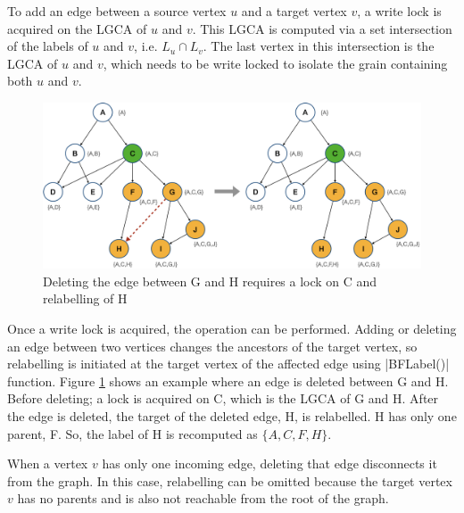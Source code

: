 To add an edge between a source vertex $u$ and a target vertex $v$, a write lock is acquired on the LGCA of $u$ and $v$. This LGCA is computed via a set intersection of the labels of $u$ and $v$, i.e. $L_u \cap L_v$. The last vertex in this intersection is the LGCA of $u$ and $v$, which needs to be write locked to isolate the grain containing both $u$ and $v$.

\begin{figure}[h]
	\centering
	\captionsetup{justification=centering}
	\includegraphics[width=\columnwidth]{figures/CALock_Delete_Edge.png}
	\caption{Deleting the edge between G and H requires a lock on C and relabelling of H}
	\label{fig:calockedgedeletion}
\end{figure}

Once a write lock is acquired, the operation can be performed. Adding or deleting an edge between two vertices changes the ancestors of the target vertex, so relabelling is initiated at the target vertex of the affected edge using \inline|BFLabel()| function. Figure \ref{fig:calockedgedeletion} shows an example where an edge is deleted between G and H. Before deleting; a lock is acquired on C, which is the LGCA of G and H. After the edge is deleted, the target of the deleted edge, H, is relabelled. H has only one parent, F. So, the label of H is recomputed as $\{A, C, F, H\}$.

When a vertex $v$ has only one incoming edge, deleting that edge disconnects it from the graph. 
In this case, relabelling can be omitted because the target vertex $v$ has no parents and is also not reachable from the root of the graph. 




